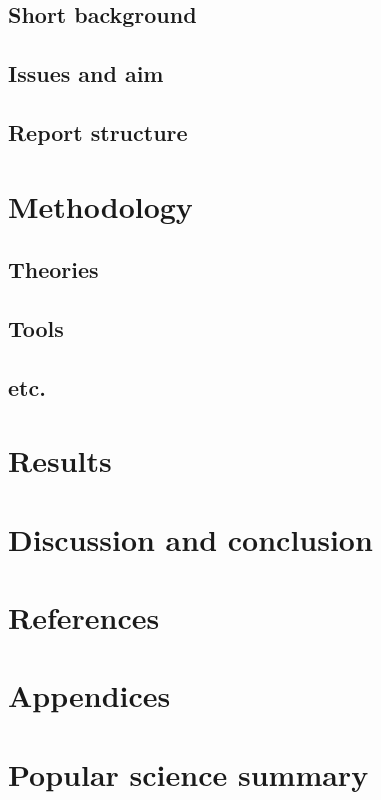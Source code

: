 \documentclass[a4paper,11pt]{article}
\begin{document}
  \subsection{Short background}
  \subsection{Issues and aim}
  \subsection{Report structure}
\section{Methodology}
  \subsection{Theories}
  \subsection{Tools}
  \subsection{etc.}
\section{Results}
\section{Discussion and conclusion}
\section{References}
\section{Appendices}
\section{Popular science summary}

\printbibliography
\end{document}
